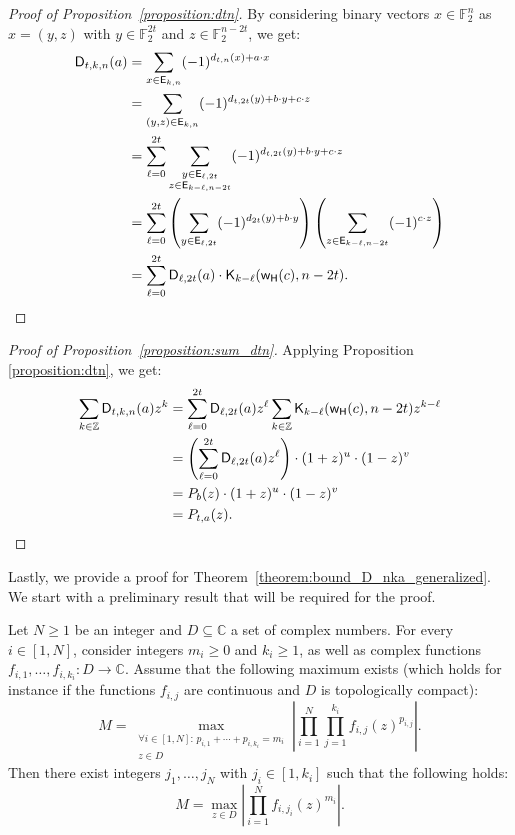 \documentclass[runningheads,orivec]{llncs}
\newcommand{\C}{\mathbb{C}}
\newcommand{\Dkna}[3]{\mathsf{D}_{#2,#1}(a)}
\newcommand{\Dtkna}[4]{\mathsf{D}_{#1,#2,#3}(#4)}
\newcommand{\Ekn}[2]{\mathsf{E}_{#1,#2}}
\newcommand{\F}{\mathbb{F}}
\newcommand{\kraw}[3]{\mathsf{K}_{#1}(#2,#3)}
\newcommand{\w}{\mathsf{w_H}}
\newcommand{\Z}{\mathbb{Z}}
\let\geq=\geqslant
\begin{document}
    \begin{proof}[Proof of Proposition~\ref{proposition:dtn}]
        By considering binary vectors $x\in\F_2^n$ as $x=(y,z)$ with $y\in\F_2^{2t}$ and $z\in\F_2^{n-2t}$, we get:	
    	\begin{align*}
    		\Dtkna{t}{k}{n}{a}&=\sum_{x \in \Ekn{k}{n}} (-1)^{d_{t,n}(x)+a\cdot x}\\
    		&=\sum_{(y,z)\in\Ekn{k}{n}} (-1)^{d_{t,2t}(y)+b\cdot y +c\cdot z}\\
    		&=\sum_{\ell=0}^{2t} \sum_{\substack{y \in \Ekn{\ell}{2t}\\z \in \Ekn{k-\ell}{n-2t}}} (-1)^{d_{t,2t}(y)+b\cdot y +c\cdot z}\\
    		&=\sum_{\ell=0}^{2t}\left(\sum_{y \in \Ekn{\ell}{2t}} (-1)^{d_{2t}(y)+b\cdot y}\right)\left( \sum_{z \in \Ekn{k-\ell}{n-2t}} (-1)^{c\cdot z}\right)\\&=\sum_{\ell=0}^{2t} \Dkna{2t}{\ell}{b}\cdot\kraw{k-\ell}{\w(c)}{n-2t}.\qedhere
    	\end{align*}
    \end{proof}
    
    \begin{proof}[Proof of Proposition~\ref{proposition:sum_dtn}]
        Applying Proposition \ref{proposition:dtn}, we get:
        \begin{align*}
            \sum_{k\in\Z}\Dtkna{t}{k}{n}{a}z^k&=\sum_{\ell=0}^{2t}\Dkna{2t}{\ell}{b}z^\ell\sum_{k\in\Z}\kraw{k-\ell}{\w(c)}{n-2t}z^{k-\ell}\\
            &=\left(\sum_{\ell=0}^{2t}\Dkna{2t}{\ell}{b}z^\ell\right)\cdot(1+z)^u\cdot(1-z)^v\\
            &=P_b(z)\cdot(1+z)^u\cdot(1-z)^v\\
            &=P_{t,a}(z).\qedhere
        \end{align*}
    \end{proof}
    
    Lastly, we provide a proof for Theorem~\ref{theorem:bound_D_nka_generalized}.
    We start with a preliminary result that will be required for the proof.
    
    \begin{lemma}\label{lemma:maximizing_args}
        Let $N\geq 1$ be an integer and $D\subseteq\C$ a set of complex numbers. For every $i\in[1,N]$, consider integers $m_i\geq 0$ and $k_i\geq 1$, as well as complex functions $f_{i,1},\dots,f_{i,k_i}:D\to\C$. Assume that the following maximum exists (which holds for instance if the functions $f_{i,j}$ are continuous and $D$ is topologically compact):
        \[
            M=\max_{\substack{\forall i\in[1,N]:\,p_{i,1}+\cdots+p_{i,k_i}=m_i\\z\in D}}\left|\prod_{i=1}^N\prod_{j=1}^{k_i}f_{i,j}(z)^{p_{i,j}}\right|.
        \]
        Then there exist integers $j_1,\dots,j_N$ with $j_i\in[1,k_i]$ such that the following holds:
        \[
            M=\max_{z\in D}\left|\prod_{i=1}^Nf_{i,j_i}(z)^{m_i}\right|.
        \]
    \end{lemma}
    
\end{document}
